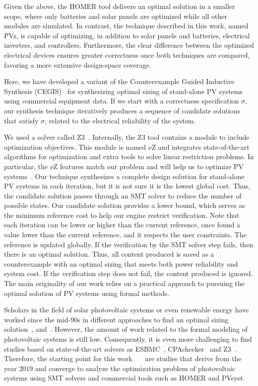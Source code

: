 \documentclass[a4paper,donotrepeattitle,fleqn]{cas-dc}
\begin{document}
Given the above, the HOMER tool delivers an optimal solution in a smaller scope, where only batteries and solar panels are optimized while all other modules are simulated. In contrast, the technique described in this work, named PVz, is capable of optimizing, in addition to solar panels and batteries, electrical inverters, and controllers. Furthermore, the clear difference between the optimized electrical devices ensures greater correctness once both techniques are compared, favoring a more extensive design-space coverage.

Here, we have developed a variant of the Counterexample Guided Inductive Synthesis (CEGIS)~\cite{AbateCAV2018} for synthesizing optimal sizing of stand-alone PV systems using commercial equipment data. If we start with a correctness specification $\sigma$, our synthesis technique iteratively produces a sequence of candidate solutions that satisfy $\sigma$, related to the electrical reliability of the system.

We used a solver called Z3~\cite{BjornerPF15}. Internally, the Z3 tool contains a module to include optimization objectives. This module is named $\nu$Z and integrates state-of-the-art algorithms for optimization and extra tools to solve linear restriction problems. In particular, the $\nu$Z features match our problem and will help us to optimize PV systems~\cite{BjornerPF15}. Our technique synthesizes a complete design solution for stand-alone PV systems in each iteration, but it is not sure it is the lowest global cost. Thus, the candidate solution passes through an SMT solver to reduce the number of possible states. Our candidate solution provides a lower bound, which serves as the minimum reference cost to help our engine restrict verification. Note that each iteration can be lower or higher than the current reference, once found a value lower than the current reference, and it respects the user constraints. The reference is updated globally. If the verification by the SMT solver step fails, then there is an optimal solution. Thus, all content produced is saved as a counterexample with an optimal sizing that meets both power reliability and system cost. If the verification step does not fail, the content produced is ignored. The main originality of our work relies on a practical approach to pursuing the optimal solution of PV systems using formal methods. 
 
Scholars in the field of solar photovoltaic systems or even renewable energy have worked since the mid-90s in different approaches to find an optimal sizing solution~\cite{Driouich2018}, and~\cite{Applasamy2011}. However, the amount of work related to the formal modeling of photovoltaic systems is still low. Consequently, it is even more challenging to find studies based on state-of-the-art solvers as ESBMC~\cite{esbmc2018}, CPAchecker~\cite{Beyer2011} and Z3~\cite{BjornerPF15}. Therefore, the starting point for this work~\cite{VSTTE2020}~\cite{TrindadeCordeiro19}~\cite{AraujoBCF16} are studies that derive from the year $2019$ and converge to analyze the optimization problem of photovoltaic systems using SMT solvers and commercial tools such as HOMER and PVsyst. 
\end{document}
